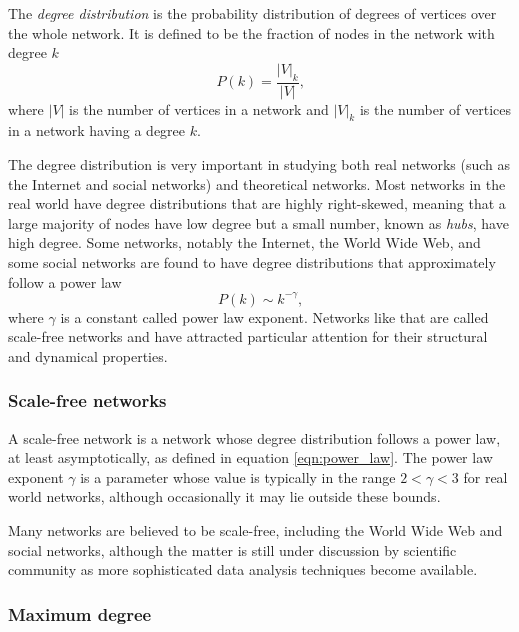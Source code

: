       The \emph{degree distribution} is the probability distribution of degrees of vertices over the whole network. It is defined to be the fraction of nodes in the network with degree $k$
      \begin{equation}
        P(k) = \frac{|V|_k}{|V|} \mbox{,}
      \end{equation}
      where $|V|$ is the number of vertices in a network and $|V|_k$ is the number of vertices in a network having a degree $k$.

      The degree distribution is very important in studying both real networks (such as the Internet and social networks) and theoretical networks. Most networks in the real world have degree distributions that are highly right-skewed, meaning that a large majority of nodes have low degree but a small number, known as \emph{hubs}, have high degree. Some networks, notably the Internet, the World Wide Web, and some social networks are found to have degree distributions that approximately follow a power law
      \begin{equation}
        P(k) \sim k^{−\gamma} \mbox{,} \label{eqn:power_law}
      \end{equation}
      where $\gamma$ is a constant called power law exponent. Networks like that are called scale-free networks and have attracted particular attention for their structural and dynamical properties.
      
      \subsubsection{Scale-free networks}
  
        A scale-free network is a network whose degree distribution follows a power law, at least asymptotically, as defined in equation \ref{eqn:power_law}.
        The power law exponent $\gamma$ is a parameter whose value is typically in the range $2 < \gamma < 3$ for real world networks, although occasionally it may lie outside these bounds\cite{OnnelaSaramakiBarabasi2007,ChoromanskiMatuszakMiekisz2013}.

        Many networks are believed to be scale-free, including the World Wide Web and social networks, although the matter is still under discussion by scientific community as more sophisticated data analysis techniques become available\cite{ClausetShaliziNewman2007}.
        
      \subsubsection{Maximum degree}
      
